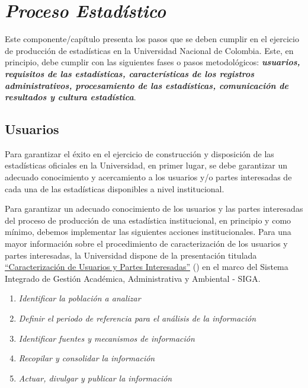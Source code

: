 \documentclass[
]{book}
\providecommand{\tightlist}{%
  \setlength{\itemsep}{0pt}\setlength{\parskip}{0pt}}
\begin{document}
\hypertarget{proceso-estaduxedstico}{%
\chapter{\texorpdfstring{\textbf{\emph{Proceso Estadístico}}}{Proceso Estadístico}}\label{proceso-estaduxedstico}}

Este componente/capítulo presenta los pasos que se deben cumplir en el ejercicio de producción de estadísticas en la Universidad Nacional de Colombia. Este, en principio, debe cumplir con las siguientes fases o pasos metodológicos: \textbf{\emph{usuarios, requisitos de las estadísticas, características de los registros administrativos, procesamiento de las estadísticas, comunicación de resultados y cultura estadística}}.

\hypertarget{usuarios}{%
\section{Usuarios}\label{usuarios}}

Para garantizar el éxito en el ejercicio de construcción y disposición de las estadísticas oficiales en la Universidad, en primer lugar, se debe garantizar un adecuado conocimiento y acercamiento a los usuarios y/o partes interesadas de cada una de las estadísticas disponibles a nivel institucional.

Para garantizar un adecuado conocimiento de los usuarios y las partes interesadas del proceso de producción de una estadística institucional, en principio y como mínimo, debemos implementar las siguientes acciones institucionales. Para una mayor información sobre el procedimiento de caracterización de los usuarios y partes interesadas, la Universidad dispone de la presentación titulada \href{http://siga.unal.edu.co/images/Modulos/Ova/Caracterizacin-de-usuarios-y-partes-interesadas.pdf}{``Caracterización de Usuarios y Partes Interesadas''} (\citet{siga2021}) en el marco del Sistema Integrado de Gestión Académica, Administrativa y Ambiental - SIGA.

\begin{enumerate}
\def\labelenumi{\arabic{enumi}.}
\tightlist
\item
  \emph{Identificar la población a analizar}
\item
  \emph{Definir el periodo de referencia para el análisis de la información}
\item
  \emph{Identificar fuentes y mecanismos de información}
\item
  \emph{Recopilar y consolidar la información}
\item
  \emph{Actuar, divulgar y publicar la información}
\end{enumerate}
\end{document}
